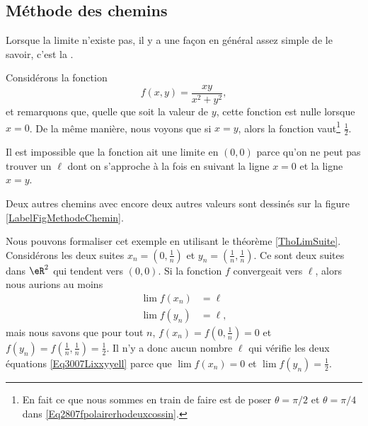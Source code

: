 \subsection{Méthode des chemins}

Lorsque la limite n'existe pas, il y a une façon en général assez simple de le savoir, c'est la .

\newcommand{\CaptionFigMethodeChemin}{Sur toute la droite $y=-x$, la fonction vaut $-1/2$, tandis que sur toute la droite $y=x/2$, elle vaut $\frac{2}{ 5 }$. Il est donc impossible que la fonction ait une limite en $(0,0)$, parce que dans toute boule autour de zéro, il y aura toujours un point de chacune de ces deux droites.}
	

\begin{example}		\label{ExFNExempleMethodeTrigigi}
	Considérons la fonction
	\begin{equation}
		f(x,y)=\frac{ xy }{ x^2+y^2 },
	\end{equation}
	et remarquons que, quelle que soit la valeur de $y$, cette fonction est nulle lorsque $x=0$. De la même manière, nous voyons que si $x=y$, alors la fonction vaut\footnote{En fait ce que nous sommes en train de faire est de poser $\theta=\pi/2$ et $\theta=\pi/4$ dans \eqref{Eq2807fpolairerhodeuxcossin}.} $\frac{ 1 }{2}$. 

	Il est impossible que la fonction ait une limite en $(0,0)$ parce qu'on ne peut pas trouver un $\ell$ dont on s'approche à la fois en suivant la ligne $x=0$ et la ligne $x=y$.

	Deux autres chemins avec encore deux autres valeurs sont dessinés sur la figure \ref{LabelFigMethodeChemin}.

\end{example}

Nous pouvons formaliser cet exemple en utilisant le théorème \ref{ThoLimSuite}. Considérons les deux suites $x_n=(0,\frac{1}{ n })$ et $y_n=(\frac{1}{ n },\frac{1}{ n })$. Ce sont deux suites dans $\eR^2$ qui tendent vers $(0,0)$. Si la fonction $f$ convergeait vers $\ell$, alors nous aurions au moins
\begin{subequations}\label{Eq3007Lixxyyell}
	\begin{align}
		\lim f(x_n)&=\ell\\
		\lim f(y_n)&=\ell,
	\end{align}
\end{subequations}
mais nous savons que pour tout $n$, $f(x_n)=f(0,\frac{1}{ n })=0$ et $f(y_n)=f(\frac{1}{ n },\frac{1}{ n })=\frac{1}{ 2 }$. Il n'y a donc aucun nombre $\ell$ qui vérifie les deux équations \eqref{Eq3007Lixxyyell} parce que $\lim f(x_n)=0$ et $\lim f(y_n)=\frac{ 1 }{2}$.

